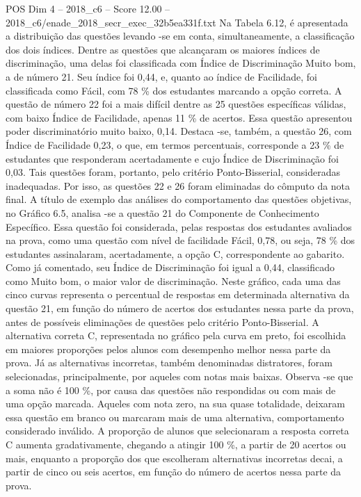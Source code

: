 \begin{textsample}{POS Dim 4 – 2018\_c6 – Score 12.00 – 2018\_c6/enade\_2018\_secr\_exec\_32b5ea331f.txt}
Na Tabela 6.12, é apresentada a distribuição das questões levando -se em conta, simultaneamente, a classificação dos dois índices.
Dentre as questões que alcançaram os maiores índices de discriminação, uma delas foi classificada com Índice de Discriminação Muito bom, a de número 21.
Seu índice foi 0,44, e, quanto ao índice de Facilidade, foi classificada como Fácil, com 78 \% dos estudantes marcando a opção correta.
A questão de número 22 foi a mais difícil dentre as 25 questões específicas válidas, com baixo Índice de Facilidade, apenas 11 \% de acertos.
Essa questão apresentou poder discriminatório muito baixo, 0,14.
Destaca -se, também, a questão 26, com Índice de Facilidade 0,23, o que, em termos percentuais, corresponde a 23 \% de estudantes que responderam acertadamente e cujo Índice de Discriminação foi 0,03.
Tais questões foram, portanto, pelo critério Ponto-Bisserial, consideradas inadequadas.
Por isso, as questões 22 e 26 foram eliminadas do cômputo da nota final.
A título de exemplo das análises do comportamento das questões objetivas, no Gráfico 6.5, analisa -se a questão 21 do Componente de Conhecimento Específico.
Essa questão foi considerada, pelas respostas dos estudantes avaliados na prova, como uma questão com nível de facilidade Fácil, 0,78, ou seja, 78 \% dos estudantes assinalaram, acertadamente, a opção C, correspondente ao gabarito.
Como já comentado, seu Índice de Discriminação foi igual a 0,44, classificado como Muito bom, o maior valor de discriminação.
Neste gráfico, cada uma das cinco curvas representa o percentual de respostas em determinada alternativa da questão 21, em função do número de acertos dos estudantes nessa parte da prova, antes de possíveis eliminações de questões pelo critério Ponto-Bisserial.
A alternativa correta C, representada no gráfico pela curva em preto, foi escolhida em maiores proporções pelos alunos com desempenho melhor nessa parte da prova.
Já as alternativas incorretas, também denominadas distratores, foram selecionadas, principalmente, por aqueles com notas mais baixas.
Observa -se que a soma não é 100 \%, por causa das questões não respondidas ou com mais de uma opção marcada.
Aqueles com nota zero, na sua quase totalidade, deixaram essa questão em branco ou marcaram mais de uma alternativa, comportamento considerado inválido.
A proporção de alunos que selecionaram a resposta correta C aumenta gradativamente, chegando a atingir 100 \%, a partir de 20 acertos ou mais, enquanto a proporção dos que escolheram alternativas incorretas decai, a partir de cinco ou seis acertos, em função do número de acertos nessa parte da prova.

\end{textsample}
